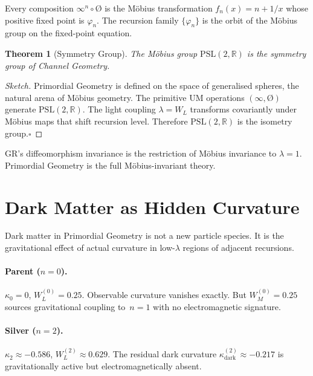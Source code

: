 \documentclass[prd,twocolumn,preprintnumbers,amsmath,amssymb]{revtex4-2}
\newtheorem{theorem}{Theorem}
\newcommand{\phig}{\varphi}
\newcommand{\WL}{W_{L}}
\newcommand{\WM}{W_{M}}
\newcommand{\kdark}{\kappa_{\mathrm{dark}}}
\begin{document}
Every composition $\infty^n \circ \text{\O}$ is the Möbius transformation
$f_n(x) = n + 1/x$ whose positive fixed point is $\phig_n$.  The recursion
family $\{\phig_n\}$ is the orbit of the Möbius group on the fixed-point equation.

\begin{theorem}[Symmetry Group]
The Möbius group $\mathrm{PSL}(2,\mathbb{R})$ is the symmetry group of Channel
Geometry.
\end{theorem}
\begin{proof}[Sketch]
Primordial Geometry is defined on the space of generalised spheres, the natural
arena of Möbius geometry.  The primitive UM operations $(\infty, \text{\O})$
generate $\mathrm{PSL}(2,\mathbb{R})$.  The light coupling $\lambda = \WL$
transforms covariantly under Möbius maps that shift recursion level.  Therefore
$\mathrm{PSL}(2,\mathbb{R})$ is the isometry group.\hfill$\square$
\end{proof}

GR's diffeomorphism invariance is the restriction of Möbius invariance to
$\lambda=1$.  Primordial Geometry is the full Möbius-invariant theory.

\section{Dark Matter as Hidden Curvature}
\label{sec:darkmatter}

Dark matter in Primordial Geometry is not a new particle species.  It is the
gravitational effect of actual curvature in low-$\lambda$ regions of adjacent
recursions.

\paragraph{Parent ($n=0$).}  $\kappa_0 = 0$, $\WL^{(0)} = 0.25$.  Observable
curvature vanishes exactly.  But $\WM^{(0)} = 0.25$ sources gravitational
coupling to~$n=1$ with no electromagnetic signature.

\paragraph{Silver ($n=2$).}  $\kappa_2 \approx -0.586$, $\WL^{(2)} \approx
0.629$.  The residual dark curvature $\kdark^{(2)} \approx -0.217$ is
gravitationally active but electromagnetically absent.
\end{document}
